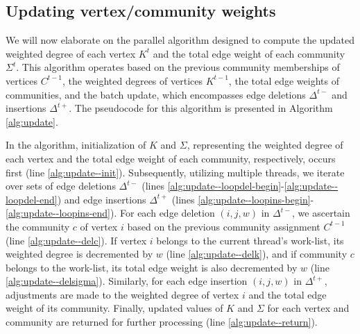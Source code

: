 


\subsection{Updating vertex/community weights}
\label{sec:our-update}

We will now elaborate on the parallel algorithm designed to compute the updated weighted degree of each vertex $K^t$ and the total edge weight of each community $\Sigma^t$. This algorithm operates based on the previous community memberships of vertices $C^{t-1}$, the weighted degrees of vertices $K^{t-1}$, the total edge weights of communities, and the batch update, which encompasses edge deletions $\Delta^{t-}$ and insertions $\Delta^{t+}$. The pseudocode for this algorithm is presented in Algorithm \ref{alg:update}.

In the algorithm, initialization of $K$ and $\Sigma$, representing the weighted degree of each vertex and the total edge weight of each community, respectively, occurs first (line \ref{alg:update--init}). Subsequently, utilizing multiple threads, we iterate over sets of edge deletions $\Delta^{t-}$ (lines \ref{alg:update--loopdel-begin}-\ref{alg:update--loopdel-end}) and edge insertions $\Delta^{t+}$ (lines \ref{alg:update--loopins-begin}-\ref{alg:update--loopins-end}). For each edge deletion $(i, j, w)$ in $\Delta^{t-}$, we ascertain the community $c$ of vertex $i$ based on the previous community assignment $C^{t-1}$ (line \ref{alg:update--delc}). If vertex $i$ belongs to the current thread's work-list, its weighted degree is decremented by $w$ (line \ref{alg:update--delk}), and if community $c$ belongs to the work-list, its total edge weight is also decremented by $w$ (line \ref{alg:update--delsigma}). Similarly, for each edge insertion $(i, j, w)$ in $\Delta^{t+}$, adjustments are made to the weighted degree of vertex $i$ and the total edge weight of its community. Finally, updated values of $K$ and $\Sigma$ for each vertex and community are returned for further processing (line \ref{alg:update--return}).


